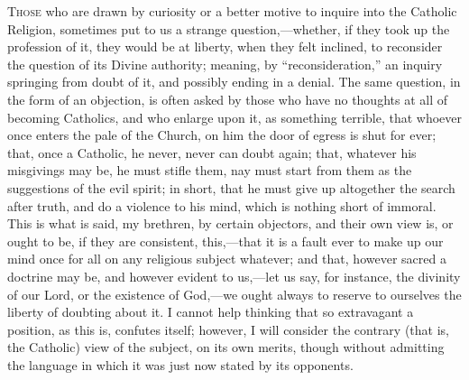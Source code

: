 
T\textsc{hose} who are drawn by curiosity or a better motive to inquire into
the Catholic Religion, sometimes put to us a strange question,—whether,
if they took up the profession of it, they would be at liberty, when
they felt inclined, to reconsider the question of its Divine
authority; meaning, by ``reconsideration,'' an inquiry
springing from doubt of it, and possibly ending in a denial. The same
question, in the form of an objection, is often asked by those who
have no thoughts at all of becoming Catholics, and who enlarge upon
it, as something terrible, that whoever once enters the pale of the
Church, on him the door of egress is shut for ever; that, once a
Catholic, he never, never can doubt again; that, whatever his
misgivings may be, he must stifle them, nay must start from them as
the suggestions of the evil spirit; in short, that he must give up
altogether the search after truth, and do a violence to his mind,
which is nothing short of immoral. This is what is said, my brethren,
by certain objectors, and their own view is, or ought to be, if they
are consistent, this,—that it is a fault ever to make up our mind
once for all on any religious subject whatever; and that, however
sacred a doctrine may be, and however evident to us,—let us say, for
instance, the divinity of our Lord, or the existence of God,—we
ought always to reserve to ourselves the liberty of doubting about it.
I cannot help thinking that so extravagant a position, as this is,
confutes itself; however, I will consider the contrary (that is, the
Catholic) view of the subject, on its own merits, though without
admitting the language in which it was just now stated by its
opponents.


